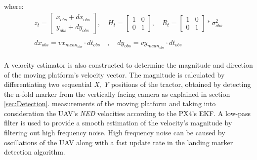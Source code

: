 \documentclass[conference, onecolumn, draftclsnofoot]{IEEEtran}
\begin{document}


where:
\begin{equation*}
    \begin{array}{l}
    z_{t} = \begin{bmatrix} 
                x_{obs} + dx_{obs} \\ 
                y_{obs} + dy_{obs}
                \end{bmatrix}, \quad 


    
    H_{t}= \begin{bmatrix} 
                1 & 0 \\ 
                0 & 1
                \end{bmatrix}, \quad
    R_{t} = \begin{bmatrix} 
                1 & 0 \\ 
                0 & 1
                \end{bmatrix}*\sigma^{2}_{obs}  \\ \\
                
dx_{obs} = vx_{mean_{obs}} \cdot dt_{obs} \quad , \quad
    dy_{obs} = vy_{mean_{obs}} \cdot dt_{obs} \quad \\
          
    \end{array}
\end{equation*}

A velocity estimator is also constructed to determine the magnitude
and direction of the moving platform's velocity vector. The magnitude
is calculated by differentiating two sequential \emph{X, Y} positions 
of the tractor, obtained by detecting the n-fold marker from the 
vertically facing camera as explained in section \ref{sec:Detection}.  
measurements of the moving platform and taking into consideration the
UAV's \emph{NED} velocities according to the PX4's EKF. A low-pass
filter is used to provide a smooth estimation of the velocity's
magnitude by filtering out high frequency noise. High frequency noise
can be caused by oscillations of the UAV along with a fast update rate
in the landing marker detection algorithm.  %
\end{document}
